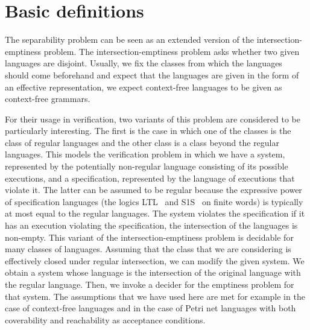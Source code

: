 \documentclass[../../diss.tex]{subfiles}
\begin{document}
\section{Basic definitions}

The separability problem can be seen as an extended version of the intersection-emptiness problem.
The intersection-emptiness problem asks whether two given languages are disjoint.
Usually, we fix the classes from which the languages should come beforehand and expect that the languages are given in the form of an effective representation, \eg we expect context-free languages to be given as context-free grammars.

\begin{problem}
\end{problem}

For their usage in verification, two variants of this problem are considered to be particularly interesting.
The first is the case in which one of the classes is the class of regular languages and the other class is a class beyond the regular languages.
This models the verification problem in which we have a system, represented by the potentially non-regular language consisting of its possible executions, and a specification, represented by the language of executions that violate it.
The latter can be assumed to be regular because the expressive power of specification languages (\eg the logics LTL~\cite{Pnueli77} and S1S~\cite{Buechi62} on finite words) is typically at most equal to the regular languages.
The system violates the specification if it has an execution violating the specification, \ie the intersection of the languages is non-empty.
This variant of the intersection-emptiness problem is decidable for many classes of languages.
Assuming that the class that we are considering is effectively closed under regular intersection, we can modify the given system.
We obtain a system whose language is the intersection of the original language with the regular language.
Then, we invoke a decider for the emptiness problem for that system.
The assumptions that we have used here are met for example in the case of context-free languages and in the case of Petri net languages with both coverability and reachability as acceptance conditions.
\end{document}
